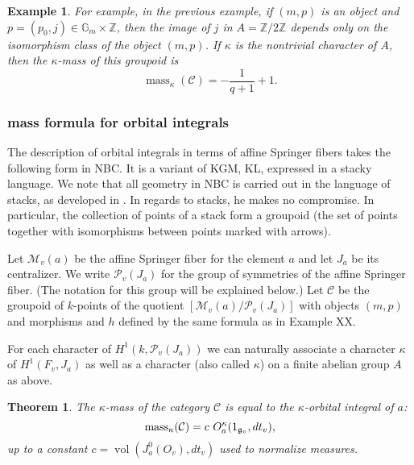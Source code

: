 \documentclass[brochure,english,12pt]{bourbaki}
\newtheorem{example}[equation]{Example}
\newtheorem{theorem}[equation]{Theorem}
\def\op#1{{\operatorname{#1}}}
\newcommand{\ring}[1]{\mathbb{#1}}
\def\g{\frak{g}}
\def\mass{\op{mass}}
\def\C{{\mathcal C}}
\def\M{{\mathcal M}}
\def\P{{\mathcal P}}
\begin{document}
\begin{example}
For example, in the previous example, if $(m,p)$ is an object and $p=(p_0,j)\in \ring{G}_m\times\ring{Z}$,
then the image of $j$ in $A=\ring{Z}/2\ring{Z}$ depends only on the isomorphism class of the
object $(m,p)$.  If $\kappa$ is the nontrivial character of $A$, then the 
$\kappa$-mass of this groupoid is
\[
\mass_\kappa(\C) = -\frac{1}{q+1} + 1.
\]
\end{example}



\subsubsection{mass formula for orbital integrals}

The description of orbital integrals in terms of affine Springer
fibers takes the following form in NBC.  It is a variant of KGM, KL,
expressed in a stacky language.  We note that all geometry in NBC is
carried out in the language of stacks, as developed in
\cite{Laumon-MB}.  In regards to stacks, he makes no compromise.  In
particular, the collection of points of a stack form a groupoid (the
set of points together with isomorphisms between points marked with
arrows).

Let $\M_v(a)$ be the affine Springer fiber for the element $a$ and let
$J_a$ be its centralizer.  We write $\P_v(J_a)$ for the group of
symmetries of the affine Springer fiber.  (The notation for this group
will be explained below.)  Let $\C$ be the groupoid of $k$-points of
the quotient $[\M_v(a)/\P_v(J_a)]$ with objects $(m,p)$ and morphisms
and $h$ defined by the same formula as in Example XX.

For each character of $H^1(k,\P_v(J_a))$ we can naturally associate a
character $\kappa$ of $H^1(F_v,J_a)$ as well as a character (also
called $\kappa$) on a finite abelian group $A$ as above.

\begin{theorem}
The $\kappa$-mass of the category $\C$ is equal to the
$\kappa$-orbital integral of $a$:
\[
\mass_\kappa(\C) = c\,\, O^\kappa_a(1_{\g_v},dt_v),
\]
up to a constant $c=\op{vol}(J^0_a(O_v),dt_v)$ used to normalize measures.
\end{theorem}
\end{document}
